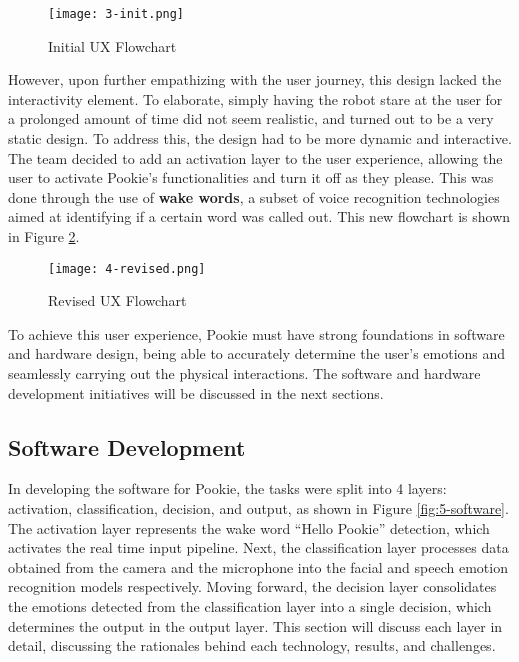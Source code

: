 \begin{figure}[ht]
    \centering
    \texttt{[image: 3-init.png]}
    \caption{Initial UX Flowchart}
    \label{fig:3-init} 
\end{figure}

However, upon further empathizing with the user journey, this design lacked the interactivity element. To elaborate, simply having the robot stare at the user for a prolonged amount of time did not seem realistic, and turned out to be a very static design. To address this, the design had to be more dynamic and interactive. The team decided to add an activation layer to the user experience, allowing the user to activate Pookie’s functionalities and turn it off as they please. This was done through the use of \textbf{wake words}, a subset of voice recognition technologies aimed at identifying if a certain word was called out. This new flowchart is shown in Figure \ref{fig:4-revised}.

\begin{figure}[!ht]
    \centering
    \texttt{[image: 4-revised.png]}
    \caption{Revised UX Flowchart}
    \label{fig:4-revised}
\end{figure}

To achieve this user experience, Pookie must have strong foundations in software and hardware design, being able to accurately determine the user’s emotions and seamlessly carrying out the physical interactions. The software and hardware development initiatives will be discussed in the next sections.

\subsection{Software Development}
In developing the software for Pookie, the tasks were split into 4 layers: activation, classification, decision, and output, as shown in Figure \ref{fig:5-software}. The activation layer represents the wake word “Hello Pookie” detection, which activates the real time input pipeline. Next, the classification layer processes data obtained from the camera and the microphone into the facial and speech emotion recognition models respectively. Moving forward, the decision layer consolidates the emotions detected from the classification layer into a single decision, which determines the output in the output layer. This section will discuss each layer in detail, discussing the rationales behind each technology, results, and challenges.

